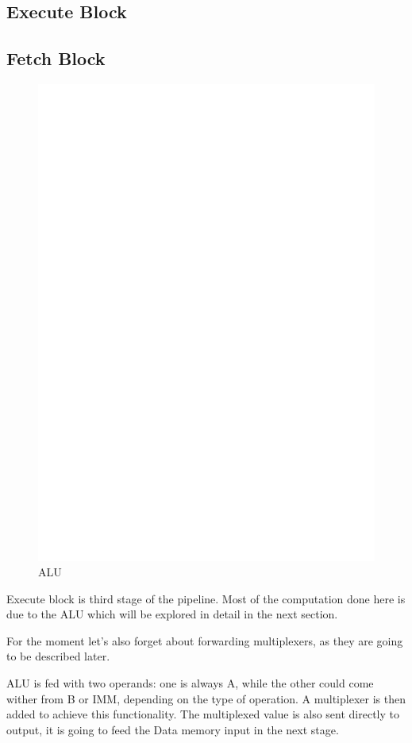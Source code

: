 \documentclass[12pt]{article}
\begin{document}
\subsection{Execute Block}
\subsection{Fetch Block}
\begin{figure}[ht!]
	\includegraphics[center]{images/DLX_ALU.eps}
	\caption{ALU}
	\label{ALU}
\end{figure}
Execute block is third stage of the pipeline. Most of the computation done here is due to the ALU which will be explored in detail in the next section.

For the moment let's also forget about forwarding multiplexers, as they are going to be described later.

ALU is fed with two operands: one is always A, while the other could come wither from B or IMM, depending on the type of operation. A multiplexer is then added to achieve this functionality.
The multiplexed value is also sent directly to output, it is going to feed the Data memory input in the next stage.
\end{document}
